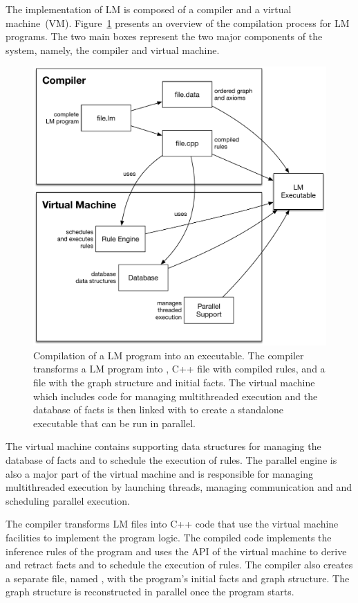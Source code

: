 The implementation of LM is composed of a compiler and a virtual machine~(VM).
Figure~\ref{fig:implementation:overview} presents an overview of the compilation
process for LM programs. The two main boxes represent the two major components
of the system, namely, the compiler and virtual machine.

\begin{figure}[ht]
  \centering
  \includegraphics[width=.75\linewidth]{figures/implementation/overview.pdf}
  \caption{Compilation of a LM program into an executable. The compiler
     transforms a LM program into , C++ file with compiled
     rules, and a  file with the graph structure and initial facts. The virtual
     machine which includes code for managing multithreaded execution and the
     database of facts is then linked with  to create a
     standalone executable that can be run in parallel.}
  \label{fig:implementation:overview}
\end{figure}

The virtual machine contains supporting data structures for managing the
database of facts and to schedule the execution of rules. The parallel engine is
also a major part of the virtual machine and is responsible for managing
multithreaded execution by launching threads, managing communication and
and scheduling parallel execution.

The compiler transforms LM files into C++ code that use the virtual machine
facilities to implement the program logic.  The compiled code implements the
inference rules of the program and uses the API of the virtual machine to derive
and retract facts and to schedule the execution of rules.  The compiler also
creates a separate file, named , with the program's initial
facts and graph structure. The graph structure is reconstructed in parallel once
the program starts.

